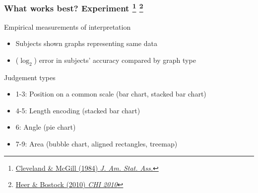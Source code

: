 
\begin{frame}
  \frametitle{What works best? Experiment
  \footnote{\tiny{\href{https://www.jstor.org/stable/2288400}{Cleveland \& McGill (1984) \textit{J. Am. Stat. Ass.}}}}  
  \footnote{\tiny{\href{http://vis.stanford.edu/files/2010-MTurk-CHI.pdf}{Heer \& Bostock (2010) \textit{CHI 2010}}}}
  }
    \textcolor{hutton_green}{Empirical measurements of interpretation}
    \begin{itemize}  
      \item Subjects shown graphs representing same data
      \item ($\log_2$) error in subjects' accuracy compared by graph type
    \end{itemize}  
    \begin{alertblock}{Judgement types}
      \begin{itemize}
        \item 1-3: Position on a common scale (bar chart, stacked bar chart)
        \item 4-5: Length encoding (stacked bar chart)
        \item 6: Angle (pie chart)
        \item 7-9: Area (bubble chart, aligned rectangles, treemap) 
      \end{itemize}
    \end{alertblock}
\end{frame}

